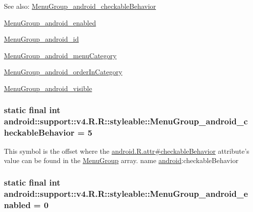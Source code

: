 \begin{Desc}
\item[See also:]\hyperlink{classandroid_1_1support_1_1v4_1_1_r_1_1styleable_126bac3dad19a00fdfbdd269f2f7d49d}{MenuGroup\_\-android\_\-checkableBehavior} 

\hyperlink{classandroid_1_1support_1_1v4_1_1_r_1_1styleable_8febcff2013f06843b34c8367e07691b}{MenuGroup\_\-android\_\-enabled} 

\hyperlink{classandroid_1_1support_1_1v4_1_1_r_1_1styleable_228a366c5643772debec90926b752e4b}{MenuGroup\_\-android\_\-id} 

\hyperlink{classandroid_1_1support_1_1v4_1_1_r_1_1styleable_b070cff86293dacf98e20c220a8e0af0}{MenuGroup\_\-android\_\-menuCategory} 

\hyperlink{classandroid_1_1support_1_1v4_1_1_r_1_1styleable_a2bd4e8b65f7ef482c13b6325dcc3878}{MenuGroup\_\-android\_\-orderInCategory} 

\hyperlink{classandroid_1_1support_1_1v4_1_1_r_1_1styleable_e6b2370a519554c52dd6d1cfe33eccd4}{MenuGroup\_\-android\_\-visible} \end{Desc}
\hypertarget{classandroid_1_1support_1_1v4_1_1_r_1_1styleable_126bac3dad19a00fdfbdd269f2f7d49d}{
\subsubsection[{MenuGroup\_\-android\_\-checkableBehavior}]{\setlength{\rightskip}{0pt plus 5cm}static final int android::support::v4.R.R::styleable::MenuGroup\_\-android\_\-checkableBehavior = 5}}
\label{classandroid_1_1support_1_1v4_1_1_r_1_1styleable_126bac3dad19a00fdfbdd269f2f7d49d}


This symbol is the offset where the \hyperlink{}{android.R.attr\#checkableBehavior} attribute's value can be found in the \hyperlink{classandroid_1_1support_1_1v4_1_1_r_1_1styleable_ba730c6d04433f7e2cb2ad1dd3b251a3}{MenuGroup} array.  name \hyperlink{namespaceandroid}{android}:checkableBehavior \hypertarget{classandroid_1_1support_1_1v4_1_1_r_1_1styleable_8febcff2013f06843b34c8367e07691b}{
\subsubsection[{MenuGroup\_\-android\_\-enabled}]{\setlength{\rightskip}{0pt plus 5cm}static final int android::support::v4.R.R::styleable::MenuGroup\_\-android\_\-enabled = 0}}
\label{classandroid_1_1support_1_1v4_1_1_r_1_1styleable_8febcff2013f06843b34c8367e07691b}



